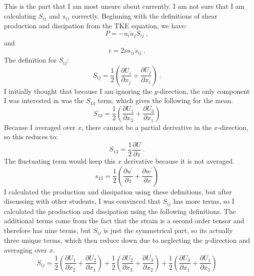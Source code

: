 \documentclass[11pt]{article}
\begin{document}
\begin{enumerate}
\begin{enumerate}
			This is the part that I am most unsure about currently. I am not sure that I am calculating $S_{ij}$ and $s_{ij}$ correctly. Beginning with the definitions of shear production and dissipation from the TKE equation, we have:
			\begin{equation}
				P = - \overline{u_i u_j} S_{ij}\:,
				\label{eq:production}
			\end{equation}
			and
			\begin{equation}
				\epsilon = 2\nu \overline{s_{ij} s_{ij}}\:.
				\label{eq:dissipation}
			\end{equation}
			The definition for $S_{ij}$:
			\begin{equation}
				S_{ij} = \frac{1}{2} \left( \frac{\partial U_i}{\partial x_j} + \frac{\partial U_j}{\partial x_i} \right)\:.
				\label{eq:Sij def}
			\end{equation}
			I initially thought that because I am ignoring the $y$-direction, the only component I was interested in was the $S_{13}$ term, which gives the following for the mean.
			\begin{equation}
				S_{13} = \frac{1}{2} \left( \frac{\partial U_1}{\partial x_3} + \frac{\partial U_3}{\partial x_1} \right)
			\end{equation}
			Because I averaged over $x$, there cannot be a partial derivative in the $x$-direction, so this reduces to:
			\begin{equation}
				S_{13} = \frac{1}{2} \frac{\partial U}{\partial z}\:.
			\end{equation}
			The fluctuating term would keep this $x$ derivative because it is not averaged.
			\begin{equation}
				s_{13} = \frac{1}{2} \left( \frac{\partial u^{\prime}}{\partial z} + \frac{\partial w^{\prime}}{\partial x} \right)
			\end{equation}
			I calculated the production and dissipation using these definitions, but after discussing with other students, I was convinced that $S_{ij}$ has more terms, so I calculated the production and dissipation using the following definitions. The additional terms come from the fact that the strain is a second order tensor and therefore has nine terms, but $S_{ij}$ is just the symmetrical part, so its actually three unique terms, which then reduce down due to neglecting the $y$-direction and averaging over $x$.
			\begin{equation}
				S_{ij} =  \frac{1}{2} \left( \frac{\partial U_1}{\partial x_2} + \frac{\partial U_2}{\partial x_1} \right) + \frac{1}{2} \left( \frac{\partial U_2}{\partial x_3} + \frac{\partial U_3}{\partial x_2} \right) + \frac{1}{2} \left( \frac{\partial U_3}{\partial x_1} + \frac{\partial U_1}{\partial x_3} \right)

\end{equation}
\end{enumerate}
\end{enumerate}
\end{document}
